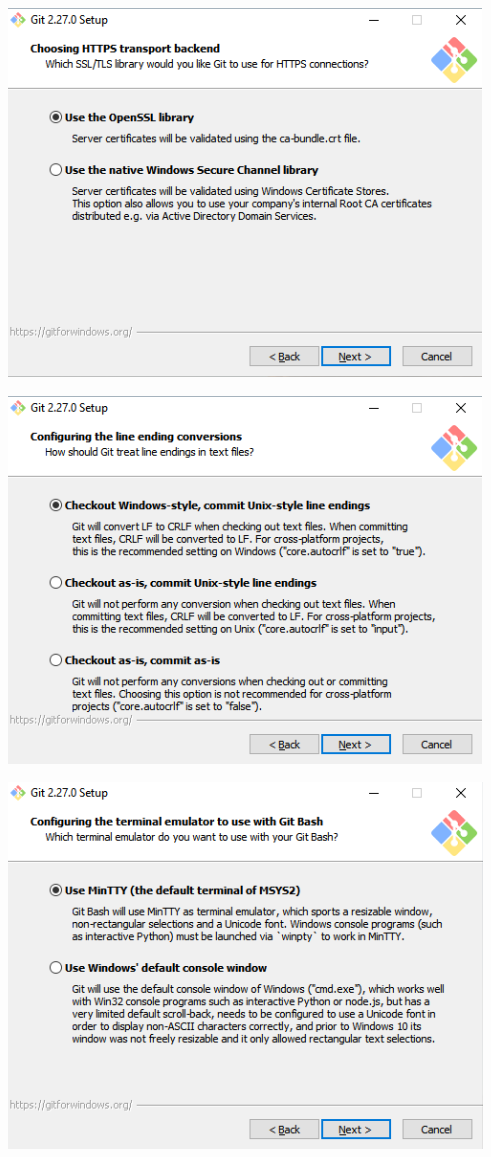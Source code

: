 \documentclass[
]{book}
\begin{document}
\includegraphics{images/05-git_8.png}

\includegraphics{images/05-git_9.png}

\includegraphics{images/05-git_10.png}
\end{document}
